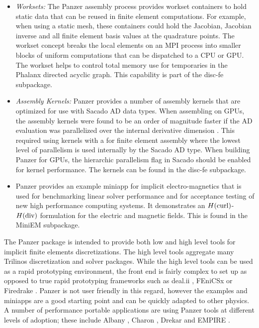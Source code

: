 \begin{itemize}
\item \emph{Worksets:} The Panzer assembly process provides workset containers to hold static data that can be reused in finite element computations. For example, when using a static mesh, these containers could hold the Jacobian, Jacobian inverse and all finite element basis values at the quadrature points. The workset concept breaks the local elements on an MPI process into smaller blocks of uniform computations that can be dispatched to a CPU or GPU. The workset helps to control total memory use for temporaries in the Phalanx directed acyclic graph. This capability is part of the disc-fe subpackage.
\item \emph{Assembly Kernels:} Panzer provides a number of assembly kernels that are optimized for use with Sacado AD data types. When assembling on GPUs, the assembly kernels were found to be an order of magnitude faster if the AD evaluation was parallelized over the internal derivative dimension \cite{phipps2022automatic}. This required using kernels with a  for finite element assembly where the lowest level of parallelism is used internally by the Sacado AD type. When building Panzer for GPUs, the  hierarchic parallelism flag in Sacado should be enabled for kernel performance. The kernels can be found in the disc-fe subpackage. 
\item Panzer provides an example miniapp for implicit electro-magnetics that is used for benchmarking linear solver performance and for acceptance testing of new high performance computing systems. It demonstrates an $H(\rm{curl})$-$H(\rm{div})$ formulation for the electric and magnetic fields. This is found in the MiniEM subpackage.
\end{itemize}

The Panzer package is intended to provide both low and high level tools for implicit finite elements discretizations. The high level tools aggregate many Trilinos discretization and solver packages. While the high level tools can be used as a rapid prototyping environment, the front end is fairly complex to set up as opposed to true rapid prototyping frameworks such as deal.ii \cite{dealII95}, FEniCSx \cite{BarattaEtal2023} or Firedrake \cite{FiredrakeUserManual}. Panzer is not user friendly in this regard, however the examples and miniapps are a good starting point and can be quickly adapted to other physics. A number of performance portable applications are using Panzer tools at different levels of adoption; these include Albany \cite{Salinger2016}, Charon \cite{CharonUsersManual2020}, Drekar \cite{Crockatt2022,Miller2019,Shadid2016mhd} and EMPIRE \cite{BettencourtBrownEtAl2021_EmpirePic}.

